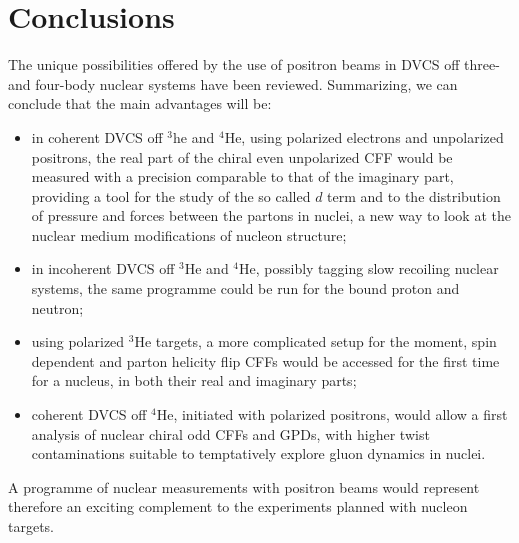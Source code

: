\documentclass[times, twoside]{PosWhiPap}
\begin{document}
\section*{Conclusions}
{
The unique possibilities offered by the use of positron beams in DVCS off three- and four-body nuclear systems have been reviewed. Summarizing, we can conclude that the main advantages will be:
\begin{itemize}
    \item in coherent DVCS off $^3$he and $^4$He, using polarized electrons and unpolarized positrons,
    the real part of the chiral even unpolarized CFF would be measured with a precision comparable to that of the imaginary part, providing a tool for the study of the so called $d$ term and to the distribution of pressure and forces between the partons in nuclei, a new way to look at the nuclear medium modifications of nucleon structure; 
    \item in incoherent DVCS off $^3$He and $^4$He, possibly tagging slow recoiling nuclear systems, the same programme could be run for the bound proton and neutron;
    \item using polarized $^3$He targets, a more complicated setup for the moment, spin dependent and parton helicity flip CFFs would be accessed for the first time for a nucleus, in both their real and imaginary parts;
    \item coherent DVCS off $^4$He, initiated with polarized positrons, would allow a first analysis of nuclear chiral odd CFFs and GPDs, with higher twist contaminations suitable to temptatively explore gluon dynamics in nuclei.
\end{itemize}
A programme of nuclear measurements with positron beams would represent therefore an exciting complement to the experiments planned with nucleon targets. 
}












\end{document}
